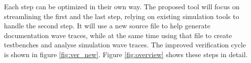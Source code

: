 \npar
{}\noindent
Each step can be optimized in their own way. The proposed tool will focus on streamlining the first and the last step, relying on existing simulation tools to handle the second step. It will use a new source file to help generate documentation wave traces, while at the same time using that file to create testbenches and analyse simulation wave traces. The improved verification cycle is shown in figure \ref{fig:ver_new}. Figure \ref{fig:overview} shows these steps in detail.\nline
{}\nline
